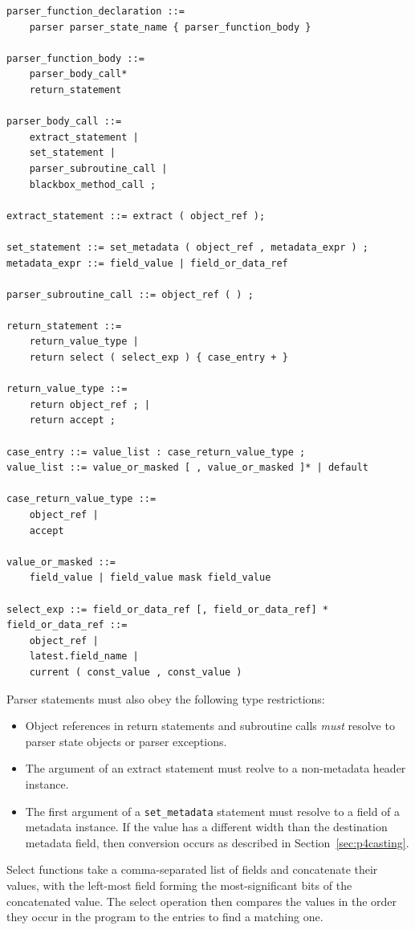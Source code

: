 \documentclass[12pt]{article}
\begin{document}
\begin{lstlisting}[style=BNFstyle]
parser_function_declaration ::=
    parser parser_state_name { parser_function_body }

parser_function_body ::=
    parser_body_call*
    return_statement

parser_body_call ::= 
    extract_statement |
    set_statement |
    parser_subroutine_call |
    blackbox_method_call ;

extract_statement ::= extract ( object_ref ); 

set_statement ::= set_metadata ( object_ref , metadata_expr ) ;
metadata_expr ::= field_value | field_or_data_ref

parser_subroutine_call ::= object_ref ( ) ; 

return_statement ::=
    return_value_type |
    return select ( select_exp ) { case_entry + }

return_value_type ::= 
    return object_ref ; | 
    return accept ;

case_entry ::= value_list : case_return_value_type ;
value_list ::= value_or_masked [ , value_or_masked ]* | default

case_return_value_type ::= 
    object_ref | 
    accept

value_or_masked ::=
    field_value | field_value mask field_value

select_exp ::= field_or_data_ref [, field_or_data_ref] * 
field_or_data_ref ::=
    object_ref |
    latest.field_name |
    current ( const_value , const_value )
\end{lstlisting}

Parser statements must also obey the following type restrictions:

\begin{itemize}
\item
Object references in return statements and subroutine calls \textit{must}
resolve to parser state objects or parser exceptions.
\item
The argument of an extract statement must reolve to a non-metadata header
instance. 
\item
The first argument of a \texttt{set_metadata} statement must resolve to a field
of a metadata instance. If the value has a different width than the destination 
metadata  field, then conversion occurs as described in
Section~\ref{sec:p4casting}.
\end{itemize}

Select functions take a comma-separated list of fields and concatenate their 
values, with the left-most field forming the most-significant bits of the 
concatenated value.  The select operation then compares the values in the 
order they occur in the program to the entries to find a matching one.
\end{document}
